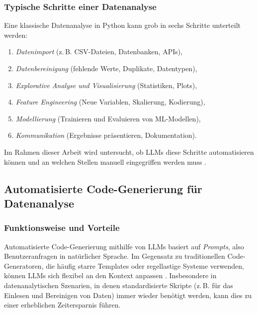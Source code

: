 \documentclass[11pt,a4paper]{article}
\begin{document}
\subsubsection{Typische Schritte einer Datenanalyse}
Eine klassische Datenanalyse in Python kann grob in sechs Schritte unterteilt werden:
\begin{enumerate}
    \item \textit{Datenimport} (z.\,B. CSV-Dateien, Datenbanken, APIs),
    \item \textit{Datenbereinigung} (fehlende Werte, Duplikate, Datentypen),
    \item \textit{Explorative Analyse und Visualisierung} (Statistiken, Plots),
    \item \textit{Feature Engineering} (Neue Variablen, Skalierung, Kodierung),
    \item \textit{Modellierung} (Trainieren und Evaluieren von ML-Modellen),
    \item \textit{Kommunikation} (Ergebnisse präsentieren, Dokumentation).
\end{enumerate}
Im Rahmen dieser Arbeit wird untersucht, ob LLMs diese Schritte automatisieren können und an welchen Stellen manuell eingegriffen werden muss \cite{web:3,web:4}.

\subsection{Automatisierte Code-Generierung für Datenanalyse}
\label{sec:AutoCode}

\subsubsection{Funktionsweise und Vorteile}
Automatisierte Code-Generierung mithilfe von LLMs basiert auf \emph{Prompts}, also Benutzeranfragen in natürlicher Sprache. Im Gegensatz zu traditionellen Code-Generatoren, die häufig starre Templates oder regellastige Systeme verwenden, können LLMs sich flexibel an den Kontext anpassen \cite{web:2}. Insbesondere in datenanalytischen Szenarien, in denen standardisierte Skripte (z.\,B. für das Einlesen und Bereinigen von Daten) immer wieder benötigt werden, kann dies zu einer erheblichen Zeitersparnis führen.
\end{document}
